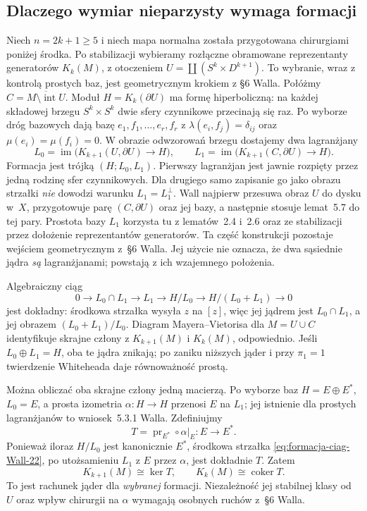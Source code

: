 \subsection*{Dlaczego wymiar nieparzysty wymaga formacji}
Niech $n=2k+1\geq5$ i niech mapa normalna
została przygotowana chirurgiami poniżej
środka. Po stabilizacji wybieramy rozłączne
obramowane reprezentanty generatorów
$K_k(M)$, z otoczeniem
$U=\coprod(S^k\times D^{k+1})$.
To wybranie, wraz z kontrolą prostych baz,
jest geometrycznym krokiem z §6 Walla.
Połóżmy $C=\overline{M\setminus\operatorname{int}U}$.
Moduł $H=K_k(\partial U)$ ma formę
hiperboliczną: na każdej składowej brzegu
$S^k\times S^k$ dwie sfery czynnikowe
przecinają się raz. Po wyborze dróg bazowych
dają bazę $e_1,f_1,\ldots,e_r,f_r$ z
$\lambda(e_i,f_j)=\delta_{ij}$ oraz
$\mu(e_i)=\mu(f_i)=0$.
W obrazie odwzorowań brzegu dostajemy
dwa lagranżjany
\[
 L_0=\operatorname{im}\bigl(K_{k+1}(U,\partial U)
                  \to H\bigr),\qquad
 L_1=\operatorname{im}\bigl(K_{k+1}(C,\partial U)
                  \to H\bigr).
\]
Formacja jest trójką $(H;L_0,L_1)$.
Pierwszy lagranżjan jest jawnie rozpięty przez
jedną rodzinę sfer czynnikowych. Dla drugiego
samo zapisanie go jako obrazu strzałki
\emph{nie} dowodzi warunku $L_1=L_1^\perp$.
Wall najpierw przesuwa obraz $U$ do dysku w~$X$,
przygotowuje parę $(C,\partial U)$ oraz jej
bazy, a następnie stosuje lemat~5.7 do tej pary.
Prostota bazy $L_1$ korzysta tu z lematów~2.4
i~2.6 oraz ze stabilizacji przez dołożenie
reprezentantów generatorów. Ta część konstrukcji
pozostaje wejściem geometrycznym z~§6 Walla.
Jej użycie nie oznacza, że dwa sąsiednie
jądra \emph{są} lagranżjanami; powstają
z ich wzajemnego położenia.

Algebraiczny ciąg
\begin{equation}\label{eq:formacja-ciag-Wall-22}
 0\longrightarrow L_0\cap L_1
 \longrightarrow L_1
 \longrightarrow H/L_0
 \longrightarrow H/(L_0+L_1)
 \longrightarrow0
\end{equation}
jest dokładny: środkowa strzałka wysyła
$z$ na $[z]$, więc jej jądrem jest
$L_0\cap L_1$, a jej obrazem
$(L_0+L_1)/L_0$.
Diagram Mayera--Vietorisa dla $M=U\cup C$
identyfikuje skrajne człony z
$K_{k+1}(M)$ i $K_k(M)$, odpowiednio.
Jeśli $L_0\oplus L_1=H$, oba te jądra
znikają; po zaniku niższych jąder i
przy $\pi_1=1$ twierdzenie Whiteheada
daje równoważność prostą.

Można obliczać oba skrajne człony jedną
macierzą. Po wyborze baz $H=E\oplus E^*$,
$L_0=E$, a prosta izometria $\alpha:H\to H$
przenosi $E$ na $L_1$; jej istnienie dla
prostych lagranżjanów to wniosek~5.3.1 Walla.
Zdefiniujmy
\[
 T=\operatorname{pr}_{E^*}\circ\alpha|_E:
 E\longrightarrow E^*.
\]
Ponieważ iloraz $H/L_0$ jest kanonicznie
$E^*$, środkowa strzałka
\eqref{eq:formacja-ciag-Wall-22}, po
utożsamieniu $L_1$ z $E$ przez $\alpha$,
jest dokładnie $T$. Zatem
\[
 K_{k+1}(M)\cong\ker T,\qquad
 K_k(M)\cong\operatorname{coker}T.
\]
To jest rachunek jąder dla \emph{wybranej}
formacji. Niezależność jej stabilnej klasy
od $U$ oraz wpływ chirurgii na $\alpha$
wymagają osobnych ruchów z~§6 Walla.

